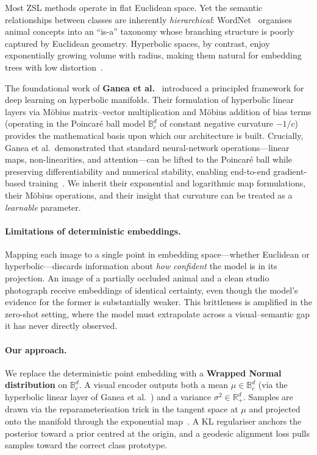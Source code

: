 \documentclass{article}
\newcommand{\R}{\mathbb{R}}
\newcommand{\poinc}{\mathbb{B}^{d}_{c}}
\begin{document}
Most ZSL methods operate in flat Euclidean space.
Yet the semantic relationships between classes are inherently \emph{hierarchical}: WordNet~\cite{miller1995wordnet} organises animal concepts into an ``is-a'' taxonomy whose branching structure is poorly captured by Euclidean geometry.
Hyperbolic spaces, by contrast, enjoy exponentially growing volume with radius, making them natural for embedding trees with low distortion~\cite{nickel2017poincare,nickel2018learning}.

The foundational work of \textbf{Ganea et al.}~\cite{ganea2018hyperbolic} introduced a principled framework for deep learning on hyperbolic manifolds.
Their formulation of hyperbolic linear layers via M\"{o}bius matrix--vector multiplication and M\"{o}bius addition of bias terms (operating in the Poincar\'{e} ball model $\poinc$ of constant negative curvature $-1/c$) provides the mathematical basis upon which our architecture is built.
Crucially, Ganea et al.\ demonstrated that standard neural-network operations---linear maps, non-linearities, and attention---can be lifted to the Poincar\'{e} ball while preserving differentiability and numerical stability, enabling end-to-end gradient-based training~\cite{ganea2018hyperbolic}.
We inherit their exponential and logarithmic map formulations, their M\"{o}bius operations, and their insight that curvature can be treated as a \emph{learnable} parameter.

\paragraph{Limitations of deterministic embeddings.}
Mapping each image to a single point in embedding space---whether Euclidean or hyperbolic---discards information about \emph{how confident} the model is in its projection.
An image of a partially occluded animal and a clean studio photograph receive embeddings of identical certainty, even though the model's evidence for the former is substantially weaker.
This brittleness is amplified in the zero-shot setting, where the model must extrapolate across a visual--semantic gap it has never directly observed.

\paragraph{Our approach.}
We replace the deterministic point embedding with a \textbf{Wrapped Normal distribution} on $\poinc$.
A visual encoder outputs both a mean $\mu \in \poinc$ (via the hyperbolic linear layer of Ganea et al.~\cite{ganea2018hyperbolic}) and a variance $\sigma^2 \in \R^d_+$.
Samples are drawn via the reparameterisation trick in the tangent space at $\mu$ and projected onto the manifold through the exponential map~\cite{nagano2019wrapped,mathieu2019continuous}.
A KL regulariser anchors the posterior toward a prior centred at the origin, and a geodesic alignment loss pulls samples toward the correct class prototype.
\end{document}
